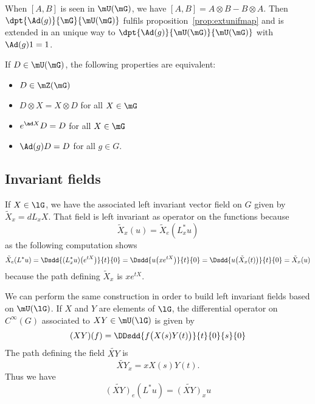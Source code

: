 When $[A,B]$ is seen in $\mU(\mG)$, we have $[A,B]=A\otimes B-B\otimes A$. Then $\dpt{ \Ad(g) }{ \mG }{ \mU(\mG) }$ fulfils proposition~\ref{prop:extunifmap} and is extended in an unique way to $\dpt{ \Ad(g) }{ \mU(\mG) }{ \mU(\mG) }$ with $\Ad(g)1=1$.

\begin{lemma}
    If $D\in\mU(\mG)$, the following properties are equivalent:
    \begin{itemize}
        \item $D\in\mZ(\mG)$
        \item $D\otimes X=X\otimes D$ for all $X\in \mG$
        \item $e^{\ad X}D=D$ for all $X\in\mG$
        \item $\Ad(g)D=D$ for all $g\in G$.
    \end{itemize}
     \label{lem:equivDAd}
\end{lemma}

\subsection{Invariant fields}

If $X\in\lG$, we have the associated left invariant vector field on $G$ given by $\tilde X_x=dL_xX$. That field is left invariant as operator on the functions because
\begin{equation}
    \tilde X_x(u)=\tilde X_e(L^*_xu)
\end{equation}
as the following computation shows
\begin{equation}
        \tilde X_e(L^*u)=\Dsdd{ (L_x^*u)\big(  e^{tX} \big) }{t}{0}
        =\Dsdd{ u\big( x e^{tX} \big) }{t}{0}
        =\Dsdd{ u\big( \tilde X_x(t) \big) }{t}{0}
        =\tilde X_x(u)
\end{equation}
because the path defining $\tilde X_x$ is $x e^{tX}$.

We can perform the same construction in order to build left invariant fields based on $\mU(\lG)$. If $X$ and $Y$ are elements of $\lG$, the  differential operator on $ C^{\infty}(G)$ associated to $XY\in\mU(\lG)$ is given by
\begin{equation}
    (XY)(f)=\DDsdd{ f\big( X(s)Y(t) \big) }{t}{0}{s}{0}
\end{equation}
The path defining the field $\widetilde{XY}$ is
\begin{equation}
    \widetilde{XY}_x=xX(s)Y(t).
\end{equation}
Thus we have
\begin{equation}        \label{EqInvarUgField}
    \widetilde{(XY)}_e(L^*u)=\widetilde{(XY)}_xu
\end{equation}

